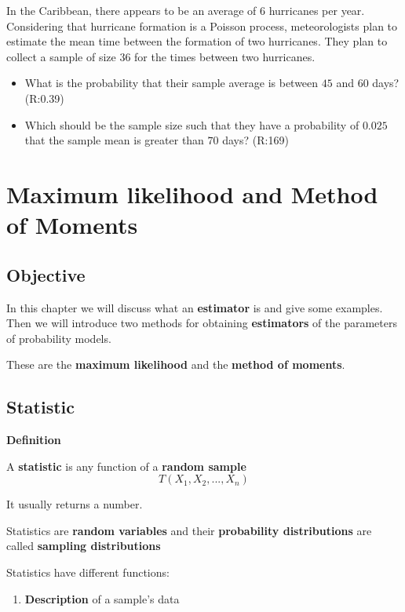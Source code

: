 \documentclass[
]{book}
\providecommand{\tightlist}{%
  \setlength{\itemsep}{0pt}\setlength{\parskip}{0pt}}
\begin{document}
In the Caribbean, there appears to be an average of \(6\) hurricanes per year. Considering that hurricane formation is a Poisson process, meteorologists plan to estimate the mean time between the formation of two hurricanes. They plan to collect a sample of size \(36\) for the times between two hurricanes.

\begin{itemize}
\item
  What is the probability that their sample average is between \(45\) and \(60\) days? (R:0.39)
\item
  Which should be the sample size such that they have a probability of \(0.025\) that the sample mean is greater than \(70\) days? (R:169)
\end{itemize}

\hypertarget{maximum-likelihood-and-method-of-moments}{%
\chapter{Maximum likelihood and Method of Moments}\label{maximum-likelihood-and-method-of-moments}}

\hypertarget{objective-8}{%
\section{Objective}\label{objective-8}}

In this chapter we will discuss what an \textbf{estimator} is and give some examples. Then we will introduce two methods for obtaining \textbf{estimators} of the parameters of probability models.

These are the \textbf{maximum likelihood} and the \textbf{method of moments}.

\hypertarget{statistic}{%
\section{Statistic}\label{statistic}}

\textbf{Definition}

A \textbf{statistic} is any function of a \textbf{random sample}
\[T(X_1,X_2, ..., X_n)\]

It usually returns a number.

Statistics are \textbf{random variables} and their \textbf{probability distributions} are called \textbf{sampling distributions}

Statistics have different functions:

\begin{enumerate}
\def\labelenumi{\arabic{enumi}.}
\tightlist
\item
  \textbf{Description} of a sample's data
\end{enumerate}
\end{document}
